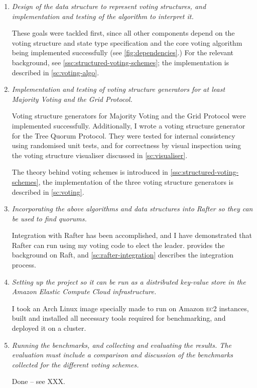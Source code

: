 \documentclass[11pt,chapterprefix=true,toc=bibliography,numbers=noendperiod,
               footnotes=multiple,twoside]{scrreprt}
\newcommand{\ECC}[0]{\textsc{ec}2 }
\begin{document}
\begin{enumerate}
    \item \emph{Design of the data structure to represent voting structures, and implementation and testing of the algorithm to interpret it.}

        These goals were tackled first, since all other components depend on the voting structure and state type specification and the core voting algorithm being implemented successfully (see \cref{fig:dependencies}.) For the relevant background, see \cref{ssc:structured-voting-schemes}; the implementation is described in \cref{sc:voting-algo}.
    \item \emph{Implementation and testing of voting structure generators for at least Majority Voting and the Grid Protocol.}

        Voting structure generators for Majority Voting and the Grid Protocol were implemented successfully. Additionally, I wrote a voting structure generator for the Tree Quorum Protocol. They were tested for internal consistency using randomised unit tests, and for correctness by visual inspection using the voting structure visualiser discussed in \cref{sc:visualiser}.

        The theory behind voting schemes is introduced in \cref{ssc:structured-voting-schemes}, the implementation of the three voting structure generators is described in \cref{sc:voting}.
    \item \emph{Incorporating the above algorithms and data structures into Rafter so they can be used to find quorums.}

        Integration with Rafter has been accomplished, and I have demonstrated that Rafter can run using my voting code to elect the leader.  provides the background on Raft, and \cref{sc:rafter-integration} describes the integration process.
    \item \emph{Setting up the project so it can be run as a distributed key-value store in the Amazon Elastic Compute Cloud infrastructure.}

        I took an Arch Linux image specially made to run on Amazon \ECC{} instances, built and installed all necessary tools required for benchmarking, and deployed it on a cluster.
    \item \emph{Running the benchmarks, and collecting and evaluating the results. The evaluation must include a comparison and discussion of the benchmarks collected for the different voting schemes.}

        Done -- see XXX.
\end{enumerate}
\end{document}
